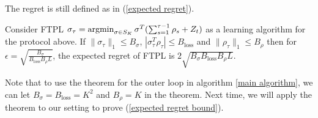 \documentclass[11pt]{article}
\begin{document}
The regret is still defined as in (\ref{expected regret}).
\begin{theorem}
Consider FTPL $\sigma_\tau = \operatorname*{argmin}_{\sigma \in S_K} \sigma^T(\sum_{s=1}^{\tau-1} \rho_s + Z_t)$ as a learning algorithm for the protocol above. If $\|\sigma_\tau\|_1 \le B_\sigma$, $|\sigma_\tau^T \rho_\tau| \le B_{\text{loss}}$ and $\|\rho_\tau\|_1 \le B_{\rho}$ then for $\epsilon = \sqrt{\frac{B_\sigma}{B_{\text{loss}}B_\rho L}}$, the expected regret of FTPL is $2 \sqrt{B_\sigma B_{\text{loss}} B_\rho L}$.
\end{theorem}
Note that to use the theorem for the outer loop in algorithm \ref{main algorithm}, we can let $B_\sigma = B_{\text{loss}} = K^2$ and $B_\rho = K$ in the theorem. Next time, we will apply the theorem to our setting to prove (\ref{expected regret bound}).

\end{document}
